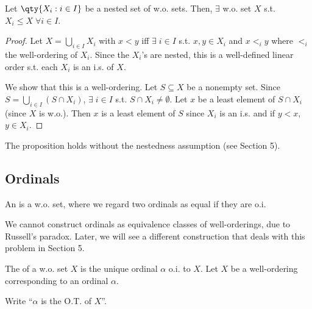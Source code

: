 \begin{proposition} \label{prp:8}
    Let $\qty{X_i : i \in I}$ be a nested set of w.o. sets.
    Then, $\exists$ w.o. set $X$ s.t. $X_i \leq X \; \forall i \in I$.
\end{proposition}

\begin{proof}
    Let $X = \bigcup_{i \in I} X_i$ with $x < y$ iff $\exists \; i \in I$ s.t. $x, y \in X_i$ and $x <_i y$ where $<_i$ the well-ordering of $X_i$.
    Since the $X_i$'s are nested, this is a well-defined linear order s.t. each $X_i$ is an i.s. of $X$.

    We show that this is a well-ordering.
    Let $S \subseteq X$ be a nonempty set.
    Since $S = \bigcup_{i \in I} (S \cap X_i)$, $\exists \; i \in I$ s.t. $S \cap X_i \neq \emptyset$.
    Let $x$ be a least element of $S \cap X_i$ (since $X$ is w.o.).
    Then $x$ is a least element of $S$ since $X_i$ is an i.s. and if $y < x$, $y \in X_i$.
\end{proof}

\begin{remark}
    The proposition holds without the nestedness assumption (see Section 5).
\end{remark}

\subsection{Ordinals}
\begin{definition}[Ordinal]
    An  is a w.o. set, where we regard two ordinals as equal if they are o.i.
\end{definition}

\begin{remark}
    We cannot construct ordinals as equivalence classes of well-orderings, due to Russell's paradox.
    Later, we will see a different construction that deals with this problem in Section 5.
\end{remark}

\begin{definition}
    The  of a w.o. set $X$ is the unique ordinal $\alpha$ o.i. to $X$.
    Let $X$ be a well-ordering corresponding to an ordinal $\alpha$.
\end{definition}

\begin{notation}
    Write ``$\alpha$ is the O.T. of $X$''.
\end{notation}

